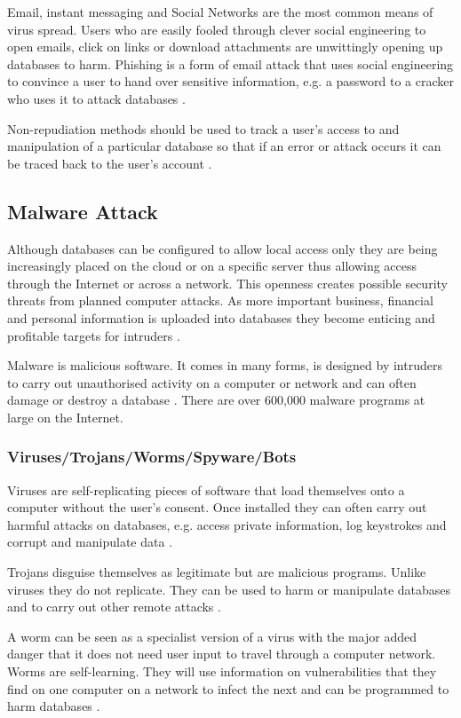 \documentclass[11pt, twocolumn]{article}
\begin{document}
Email, instant messaging and Social Networks are the most common means of virus spread.  Users who are easily fooled through clever social engineering to open emails, click on links or download attachments are unwittingly opening up databases to harm.  Phishing is a form of email attack that uses social engineering to convince a user to hand over sensitive information, e.g. a password to a cracker who uses it to attack databases \cite{Bas}.

Non-repudiation methods should be used to track a user’s access to and manipulation of a particular database so that if an error or attack occurs it can be traced back to the user’s account \cite{Thur}.

\subsection{Malware Attack}
Although databases can be configured to allow local access only they are being increasingly placed on the cloud or on a specific server thus allowing access through the Internet or across a network.  This openness creates possible security threats from planned computer attacks.  As more important business, financial and personal information is uploaded into databases they become enticing and profitable targets for intruders \cite{Bas}.

Malware is malicious software.  It comes in many forms, is designed by intruders to carry out unauthorised activity on a computer or network and can often damage or destroy a database \cite{Bas}.  There are over 600,000 malware programs at large on the Internet.

\subsubsection{Viruses/Trojans/Worms/Spyware/Bots}
Viruses are self-replicating pieces of software that load themselves onto a computer without the user’s consent.  Once installed they can often carry out harmful attacks on databases, e.g. access private information, log keystrokes and corrupt and manipulate data \cite{Bas}.

Trojans disguise themselves as legitimate but are malicious programs.  Unlike viruses they do not replicate.  They can be used to harm or manipulate databases and to carry out other remote attacks \cite{Bas}.

A worm can be seen as a specialist version of a virus with the major added danger that it does not need user input to travel through a computer network.  Worms are self-learning.  They will use information on vulnerabilities that they find on one computer on a network to infect the next and can be programmed to harm databases \cite{Bas}.
\end{document}

